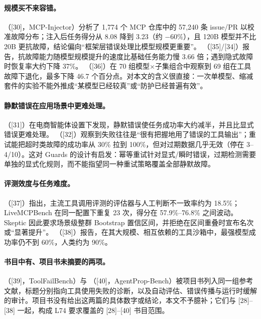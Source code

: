 \documentclass[11pt,a4paper]{article}
\begin{document}
\paragraph{规模买不来容错。}
\cite{mcpinjector2026}（[30]，MCP-Injector）分析了 1{,}774 个 MCP 仓库中的 57{,}240 条 issue/PR 以校准故障分布；注入后任务得分从 8.08 降到 3.23（约 $-60\%$），且 120B 模型并不比 20B 更抗故障，结论偏向“框架层错误处理比模型规模更重要”。
\cite{toolmaze2026,toolbenchx2026}（[35]/[34]）报告，抗故障能力随模型规模提升的速度比基础任务能力慢 3.66 倍；遇到隐式故障时恢复率大约下降 37\%。
\cite{bench2robust2026}（[36]）在 70 组模型$\times$子集组合中观察到 69 组在工具故障下退化，最多下降 46.7 个百分点。对本文的含义很直接：一次单模型、缩减套件的实验不能外推成“某模型已经较真”或“防护已经普遍有效”。

\paragraph{静默错误在应用场景中更难处理。}
\cite{rite2026}（[31]）在电商智能体设置下发现，静默错误使任务成功率大约减半，并且比显式错误更难处理。
\cite{agentcheck2026}（[32]）观察到失败往往是“很有把握地用了错误的工具输出”；重试能把超时类故障的成功率从 30\% 拉到 100\%，但对过期数据几乎无效（停在 3--4/10）。这对 Guards 的设计有启发：幂等重试针对显式/瞬时错误，过期检测需要单独的显式化规则，而不能指望同一种重试策略覆盖全部静默故障。

\paragraph{评测效度与任务难度。}
\cite{benchbenchmarks2026}（[37]）指出，主流工具调用评测的评估器与人工判断不一致率约为 18.5\%；LiveMCPBench 在同一配置下重复 23 次，得分在 57.9\%--76.8\% 之间波动。Skeptic 因此要求场景级整群 Bootstrap 置信区间，并拒绝在区间重叠时宣布名次或“显著提升”。
\cite{complexmcp2026}（[38]）报告，在其大规模、相互依赖的工具沙箱中，最强模型成功率仍不到 60\%，人类约为 90\%。

\paragraph{书目中有、项目书未摘要的两项。}
\cite{toolfailbench2026}（[39]，ToolFailBench）与 \cite{agentpropbench2026}（[40]，AgentProp-Bench）被项目书列入同一组参考文献，标题分别指向工具使用失败的诊断，以及自动评估、错误传播与运行时缓解的审计。项目书没有给出这两篇的具体数字或结论，本文不予臆补；它们与 [28]--[38] 一起，构成 L74 要求覆盖的 [28]--[40] 书目范围。
\end{document}

